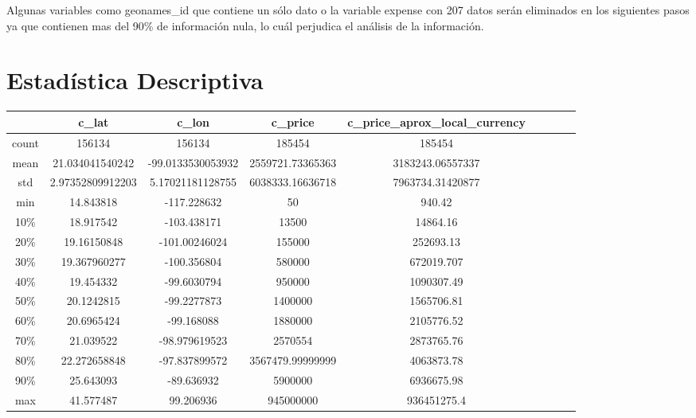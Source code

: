 \documentclass{report}
\begin{document}
    Algunas variables como geonames\_id que contiene un sólo dato o la variable expense con 207 datos serán eliminados en los siguientes pasos ya que contienen mas del 90\% de información nula, lo cuál perjudica el análisis de la información.
    
    \section{Estadística Descriptiva}
\begin{center}
\begin{tabular}{||c|c|c|c|c|c|c|c|c||}
\hline
& c\_lat           & c\_lon            & c\_price         & c\_price\_aprox\_local\_currency \\
\hline\hline
count & 156134           & 156134            & 185454           & 185454                           \\
mean  & 21.034041540242  & -99.0133530053932 & 2559721.73365363 & 3183243.06557337                 \\
std   & 2.97352809912203 & 5.17021181128755  & 6038333.16636718 & 7963734.31420877                 \\
min   & 14.843818        & -117.228632       & 50               & 940.42                           \\
10\%  & 18.917542        & -103.438171       & 13500            & 14864.16                         \\
20\%  & 19.16150848      & -101.00246024     & 155000           & 252693.13                        \\
30\%  & 19.367960277     & -100.356804       & 580000           & 672019.707                       \\
40\%  & 19.454332        & -99.6030794       & 950000           & 1090307.49                       \\
50\%  & 20.1242815       & -99.2277873       & 1400000          & 1565706.81                       \\
60\%  & 20.6965424       & -99.168088        & 1880000          & 2105776.52                       \\
70\%  & 21.039522        & -98.979619523     & 2570554          & 2873765.76                       \\
80\%  & 22.272658848     & -97.837899572     & 3567479.99999999 & 4063873.78                       \\
90\%  & 25.643093        & -89.636932        & 5900000          & 6936675.98                       \\
max   & 41.577487        & 99.206936         & 945000000        & 936451275.4      \\                   
\hline
\end{tabular}
\end{center}
\end{document}
